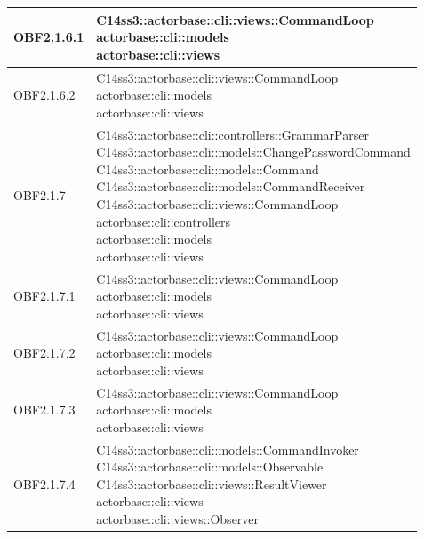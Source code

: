 \documentclass{scalatekids-article}
\begin{document}
\begin{longtable}[H]{|p{4.5cm}|p{13cm}|}
\hline
OBF2.1.6.1 & \multiLineCell[t]{C14ss3::actorbase::cli::views::CommandLoop\\actorbase::cli::models\\actorbase::cli::views\\}\\
\hline
OBF2.1.6.2 & \multiLineCell[t]{C14ss3::actorbase::cli::views::CommandLoop\\actorbase::cli::models\\actorbase::cli::views\\}\\
\hline
OBF2.1.7 & \multiLineCell[t]{C14ss3::actorbase::cli::controllers::GrammarParser\\C14ss3::actorbase::cli::models::ChangePasswordCommand\\C14ss3::actorbase::cli::models::Command\\C14ss3::actorbase::cli::models::CommandReceiver\\C14ss3::actorbase::cli::views::CommandLoop\\actorbase::cli::controllers\\actorbase::cli::models\\actorbase::cli::views\\}\\
\hline
OBF2.1.7.1 & \multiLineCell[t]{C14ss3::actorbase::cli::views::CommandLoop\\actorbase::cli::models\\actorbase::cli::views\\}\\
\hline
OBF2.1.7.2 & \multiLineCell[t]{C14ss3::actorbase::cli::views::CommandLoop\\actorbase::cli::models\\actorbase::cli::views\\}\\
\hline
OBF2.1.7.3 & \multiLineCell[t]{C14ss3::actorbase::cli::views::CommandLoop\\actorbase::cli::models\\actorbase::cli::views\\}\\
\hline
OBF2.1.7.4 & \multiLineCell[t]{C14ss3::actorbase::cli::models::CommandInvoker\\C14ss3::actorbase::cli::models::Observable\\C14ss3::actorbase::cli::views::ResultViewer\\actorbase::cli::views\\actorbase::cli::views::Observer\\}\\

\end{longtable}
\end{document}
